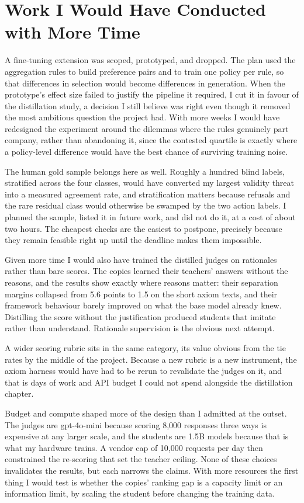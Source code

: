 \documentclass[11pt,a4paper]{article}
\begin{document}
\section*{Work I Would Have Conducted with More Time}

A fine-tuning extension was scoped, prototyped, and dropped. The plan used the aggregation rules to build preference pairs and to train one policy per rule, so that differences in selection would become differences in generation. When the prototype's effect size failed to justify the pipeline it required, I cut it in favour of the distillation study, a decision I still believe was right even though it removed the most ambitious question the project had. With more weeks I would have redesigned the experiment around the dilemmas where the rules genuinely part company, rather than abandoning it, since the contested quartile is exactly where a policy-level difference would have the best chance of surviving training noise.

The human gold sample belongs here as well. Roughly a hundred blind labels, stratified across the four classes, would have converted my largest validity threat into a measured agreement rate, and stratification matters because refusals and the rare residual class would otherwise be swamped by the two action labels. I planned the sample, listed it in future work, and did not do it, at a cost of about two hours. The cheapest checks are the easiest to postpone, precisely because they remain feasible right up until the deadline makes them impossible.

Given more time I would also have trained the distilled judges on rationales rather than bare scores. The copies learned their teachers' answers without the reasons, and the results show exactly where reasons matter: their separation margins collapsed from 5.6 points to 1.5 on the short axiom texts, and their framework behaviour barely improved on what the base model already knew. Distilling the score without the justification produced students that imitate rather than understand. Rationale supervision is the obvious next attempt.

A wider scoring rubric sits in the same category, its value obvious from the tie rates by the middle of the project. Because a new rubric is a new instrument, the axiom harness would have had to be rerun to revalidate the judges on it, and that is days of work and API budget I could not spend alongside the distillation chapter.

Budget and compute shaped more of the design than I admitted at the outset. The judges are gpt-4o-mini because scoring 8,000 responses three ways is expensive at any larger scale, and the students are 1.5B models because that is what my hardware trains. A vendor cap of 10,000 requests per day then constrained the re-scoring that set the teacher ceiling. None of these choices invalidates the results, but each narrows the claims. With more resources the first thing I would test is whether the copies' ranking gap is a capacity limit or an information limit, by scaling the student before changing the training data.
\end{document}
